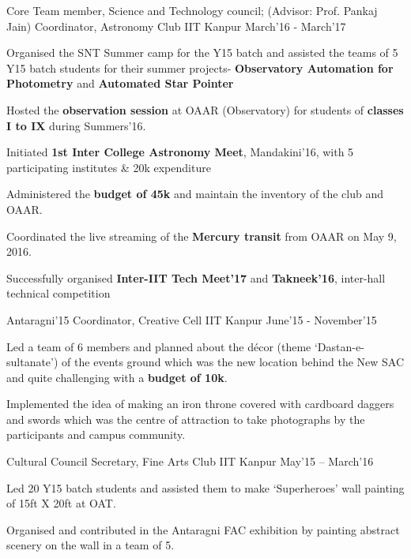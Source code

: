 \begin{cventries}
  \cventry
    {Core Team member, Science and Technology council; (Advisor: Prof. Pankaj Jain)}
    {Coordinator, Astronomy Club}
    {IIT Kanpur}
    {March’16 - March'17}
    {
      \begin{cvitems}
        \item {Organised the SNT Summer camp for the Y15 batch and assisted the teams of 5 Y15 batch students for their summer projects- \textbf{Observatory Automation for Photometry} and \textbf{Automated Star Pointer}}
        \item {Hosted the \textbf{observation session} at OAAR (Observatory) for students of \textbf{classes I to IX} during Summers’16.}
        \item {Initiated \textbf{1st Inter College Astronomy Meet}, Mandakini’16, with 5 participating institutes \& 20k expenditure}
        \item {Administered the \textbf{budget of 45k} and maintain the inventory of the club and OAAR.}
        \item {Coordinated the live streaming of the \textbf{Mercury transit} from OAAR on May 9, 2016.}
        \item {Successfully organised \textbf{Inter-IIT Tech Meet'17} and \textbf{Takneek’16}, inter-hall technical competition}
      \end{cvitems}
    }
  \cventry
    {Antaragni'15}
    {Coordinator, Creative Cell}
    {IIT Kanpur}
    {June’15 - November’15}
    {
      \begin{cvitems}
        \item {Led a team of 6 members and planned about the décor (theme ‘Dastan-e-sultanate’) of the events ground which was the new location behind the New SAC and quite challenging with a \textbf{budget of 10k}.}
        \item {Implemented the idea of making an iron throne covered with cardboard daggers and swords which was the centre of attraction to take photographs by the participants and campus community.}
      \end{cvitems}
    }
  \cventry
    {Cultural Council}
    {Secretary, Fine Arts Club}
    {IIT Kanpur}
    {May’15 – March’16}
    {
      \begin{cvitems}
       \item {Led 20 Y15 batch students and assisted them to make ‘Superheroes’ wall painting of 15ft X 20ft at OAT.}
       \item {Organised and contributed in the Antaragni FAC exhibition by painting abstract scenery on the wall in a team of 5.}

\end{cvitems}}
\end{cventries}
